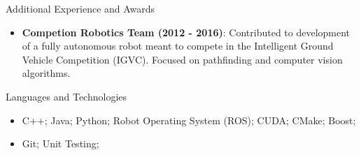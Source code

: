 \documentclass[]{mcdowellcv}
\begin{document}
	\begin{cvsection}{Additional Experience and Awards}
		\begin{cvsubsection}{}{}{}	
			\begin{itemize}	
                \item \textbf{Competion Robotics Team (2012 - 2016)}: Contributed to development of a fully autonomous robot meant to compete in the Intelligent Ground Vehicle Competition (IGVC). Focused on pathfinding and computer vision algorithms.
			\end{itemize}
		\end{cvsubsection}
	\end{cvsection}
	
	\begin{cvsection}{Languages and Technologies}
		\begin{cvsubsection}{}{}{}	
			\begin{itemize}
                \item C++; Java; Python; Robot Operating System (ROS); CUDA; CMake; Boost; 
				\item Git; Unit Testing;
			\end{itemize}
		\end{cvsubsection}
	\end{cvsection}
	
\end{document}
